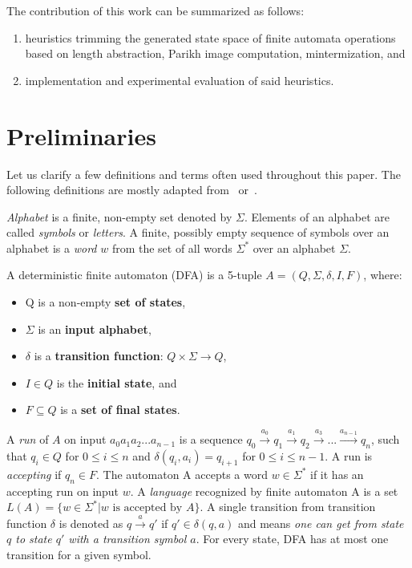 The contribution of this work can be summarized as follows:
\begin{enumerate}
    \item heuristics trimming the generated state space of finite automata operations based on length abstraction, Parikh image computation, mintermization, and
    \item implementation and experimental evaluation of said heuristics.
\end{enumerate}


\chapter{Preliminaries}
Let us clarify a few definitions and terms often used throughout this paper. The following definitions are mostly adapted from~\cite{Esparza} or~\cite{Sipser}.

\emph{Alphabet} is a finite, non-empty set denoted by $\Sigma$. Elements of an alphabet are called \emph{symbols} or \emph{letters}. A finite, possibly empty sequence of symbols over an alphabet is a \emph{word} $w$ from the set of all words $\Sigma^*$ over an alphabet $\Sigma$.

\begin{definition} \hfill \newline
    A deterministic finite automaton (DFA) is a 5-tuple $A = (Q, \Sigma, \delta, I, F)$, where:
    \begin{itemize}
        \item Q is a non-empty \textbf{set of states},
        \item $\Sigma$ is an \textbf{input alphabet},
        \item $\delta$ is a \textbf{transition function}: $Q \times \Sigma \rightarrow{} Q$,
        \item $I \in Q$ is the \textbf{initial state}, and
        \item $F \subseteq Q$ is a \textbf{set of final states}.
    \end{itemize}
\end{definition}

A \emph{run} of $A$ on input $a_0a_1a_2...a_{n-1}$ is a sequence $q_0 \xrightarrow{a_0} q_1 \xrightarrow{a_1} q_2 \xrightarrow{a_3} ... \xrightarrow{a_{n-1}} q_n$, such that $q_i \in Q$ for $0 \leq i \leq n$ and $\delta(q_i, a_i) = q_{i+1}$ for $0 \leq i \leq n - 1$. A run is \emph{accepting} if $q_n \in F$. The automaton A accepts a word $w \in \Sigma^*$ if it has an accepting run on input $w$. A \emph{language} recognized by finite automaton A is a set $L(A) = \{w \in \Sigma^* | w \text{ is accepted by } A\}$. A single transition from transition function $\delta$ is denoted as $q \xrightarrow{a} q'$ if $q' \in \delta(q, a)$ and means \textit{one can get from state $q$ to state $q'$ with a transition symbol $a$}. For every state, DFA has at most one transition for a given symbol.

